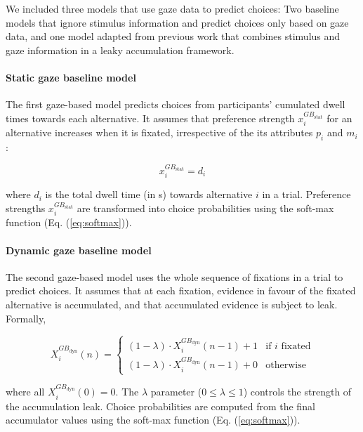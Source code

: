 \documentclass[11pt, a4paper]{article}
\begin{document}
We included three models that use gaze data to predict choices: Two baseline models that ignore stimulus information and predict choices only based on gaze data, and one model adapted from previous work \autocite{glickman2019FormationPreferenceRisky} that combines stimulus and gaze information in a leaky accumulation framework.
\paragraph{Static gaze baseline model}

The first gaze-based model predicts choices from participants' cumulated dwell times towards each alternative. It assumes that preference strength $x_i^{GB_{\text{stat}}}$ for an alternative increases when it is fixated, irrespective of the its attributes $p_i$ and $m_i$:

\begin{equation}
    x_i^{GB_{\text{stat}}} = d_i
\end{equation}

where $d_i$ is the total dwell time (in s) towards alternative $i$ in a trial. Preference strengths $x_i^{GB_{\text{stat}}}$ are transformed into choice probabilities using the soft-max function (Eq. (\ref{eq:softmax})).

\paragraph{Dynamic gaze baseline model}

The second gaze-based model uses the whole sequence of fixations in a trial to predict choices. It assumes that at each fixation, evidence in favour of the fixated alternative is accumulated, and that accumulated evidence is subject to leak. Formally,

\begin{equation}
    X_i^{GB_{\text{dyn}}}(n) = \begin{cases}
             (1 - \lambda) \cdot X_i^{GB_{\text{dyn}}}(n - 1) + 1 &\text{if $i$ fixated}\\
             (1 - \lambda) \cdot X_i^{GB_{\text{dyn}}}(n - 1) + 0 &\text{otherwise}
             \end{cases}
\end{equation}

where all $X_i^{GB_{\text{dyn}}}(0) = 0$. The $\lambda$ parameter ($0 \le \lambda \le 1$) controls the strength of the accumulation leak.
Choice probabilities are computed from the final accumulator values using the soft-max function (Eq. (\ref{eq:softmax})).
\end{document}
